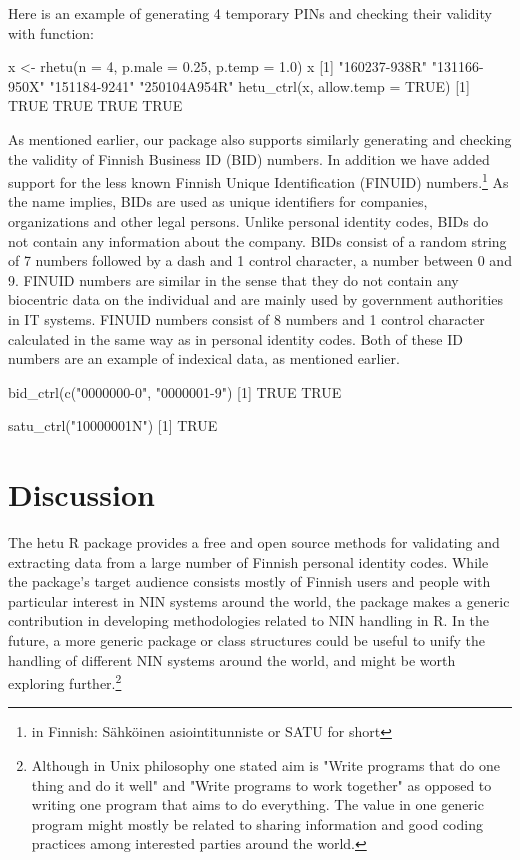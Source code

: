 Here is an example of generating 4 temporary PINs and checking their validity with  function:

\begin{example}
  x <- rhetu(n = 4, p.male = 0.25, p.temp = 1.0)
  x
  [1] "160237-938R" "131166-950X" "151184-9241" "250104A954R"
  hetu_ctrl(x, allow.temp = TRUE)
  [1] TRUE TRUE TRUE TRUE
\end{example}

As mentioned earlier, our package also supports similarly generating and checking the validity of Finnish Business ID (BID) numbers. In addition we have added support for the less known Finnish Unique Identification (FINUID) numbers.\footnote{in Finnish: Sähköinen asiointitunniste or SATU for short} As the name implies, BIDs are used as unique identifiers for companies, organizations and other legal persons. Unlike personal identity codes, BIDs do not contain any information about the company. BIDs consist of a random string of 7 numbers followed by a dash and 1 control character, a number between 0 and 9. FINUID numbers are similar in the sense that they do not contain any biocentric data on the individual and are mainly used by government authorities in IT systems. FINUID numbers consist of 8 numbers and 1 control character calculated in the same way as in personal identity codes. Both of these ID numbers are an example of indexical data, as mentioned earlier.

\begin{example}
  bid_ctrl(c("0000000-0", "0000001-9")
  [1] TRUE TRUE
  
  satu_ctrl("10000001N")
  [1] TRUE
\end{example}

\section{Discussion}

The hetu R package provides a free and open source methods for validating and extracting data from a large number of Finnish personal identity codes. While the package's target audience consists mostly of Finnish users and people with particular interest in NIN systems around the world, the package makes a generic contribution in developing methodologies related to NIN handling in R. In the future, a more generic package or class structures could be useful to unify the handling of different NIN systems around the world, and might be worth exploring further.\footnote{Although in Unix philosophy one stated aim is "Write programs that do one thing and do it well" and "Write programs to work together" as opposed to writing one program that aims to do everything. The value in one generic program might mostly be related to sharing information and good coding practices among interested parties around the world.}

